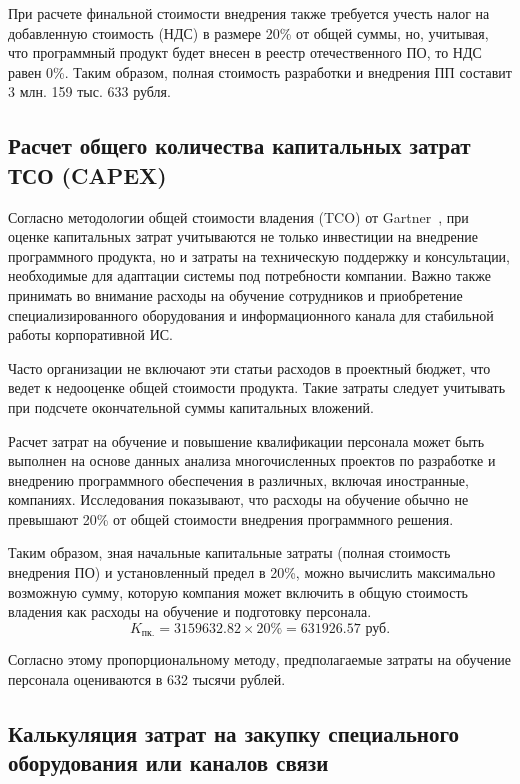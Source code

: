 При расчете финальной стоимости внедрения также требуется учесть налог на добавленную стоимость (НДС) в размере 20\% от общей суммы, но, учитывая, что программный продукт будет внесен в реестр отечественного ПО, то НДС равен 0\%. Таким образом, полная стоимость разработки и внедрения ПП составит 3 млн. 159 тыс. 633 рубля.

\subsection{Расчет общего количества капитальных затрат ТСО (CAPEX)}

Согласно методологии общей стоимости владения (TCO) от Gartner~\cite{bib:tco_gartner}, при оценке капитальных затрат учитываются не только инвестиции на внедрение программного продукта, но и затраты на техническую поддержку и консультации, необходимые для адаптации системы под потребности компании. Важно также принимать во внимание расходы на обучение сотрудников и приобретение специализированного оборудования и информационного канала для стабильной работы корпоративной ИС.

Часто организации не включают эти статьи расходов в проектный бюджет, что ведет к недооценке общей стоимости продукта. Такие затраты следует учитывать при подсчете окончательной суммы капитальных вложений.

Расчет затрат на обучение и повышение квалификации персонала может быть выполнен на основе данных анализа многочисленных проектов по разработке и внедрению программного обеспечения в различных, включая иностранные, компаниях. Исследования показывают, что расходы на обучение обычно не превышают 20\% от общей стоимости внедрения программного решения.

Таким образом, зная начальные капитальные затраты (полная стоимость внедрения ПО) и установленный предел в 20\%, можно вычислить максимально возможную сумму, которую компания может включить в общую стоимость владения как расходы на обучение и подготовку персонала.
$$K_{\text{пк.}} = 3159632.82 \times 20\% = 631926.57 \text{ руб.}$$

Согласно этому пропорциональному методу, предполагаемые затраты на обучение персонала оцениваются в 632 тысячи рублей.

\subsection{Калькуляция затрат на закупку специального оборудования или каналов связи}

